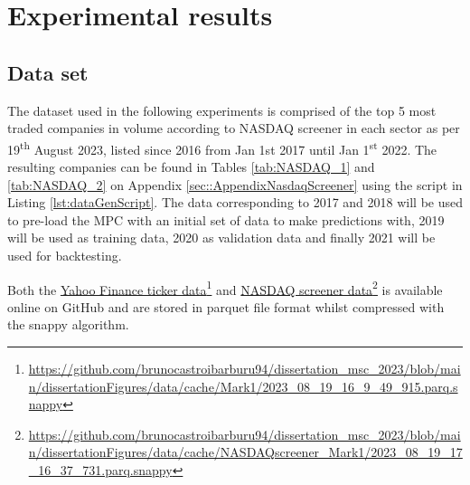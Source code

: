 \chapter{Experimental results}
\label{ch5}

\singlespacing %
\minitoc %
\doublespacing %

\section{Data set}


The dataset used in the following experiments is comprised of the top 5 most traded companies in volume according to NASDAQ screener in each sector as per 19\textsuperscript{th} August 2023, listed since 2016 from Jan 1st 2017 until Jan 1\textsuperscript{st} 2022. The resulting companies can be found in Tables \ref{tab:NASDAQ_1} and \ref{tab:NASDAQ_2}  on Appendix \ref{sec::AppendixNasdaqScreener} using the script in Listing \ref{lst:dataGenScript}. The data corresponding to 2017 and 2018 will be used to pre-load the \ac{MPC} with an initial set of data to make predictions with, 2019 will be used as training data, 2020 as validation data and finally 2021 will be used for backtesting.

Both the \href{https://github.com/brunocastroibarburu94/dissertation_msc_2023/blob/main/dissertationFigures/data/cache/Mark1/2023_08_19_16_9_49_915.parq.snappy}{Yahoo Finance ticker data}\footnote{\url{https://github.com/brunocastroibarburu94/dissertation_msc_2023/blob/main/dissertationFigures/data/cache/Mark1/2023_08_19_16_9_49_915.parq.snappy}} and  \href{https://github.com/brunocastroibarburu94/dissertation_msc_2023/blob/main/dissertationFigures/data/cache/NASDAQscreener_Mark1/2023_08_19_17_16_37_731.parq.snappy}{NASDAQ screener data}\footnote{\url{https://github.com/brunocastroibarburu94/dissertation_msc_2023/blob/main/dissertationFigures/data/cache/NASDAQscreener_Mark1/2023_08_19_17_16_37_731.parq.snappy}} is available online on GitHub and are stored in parquet file format whilst compressed with the snappy algorithm.

\clearpage

